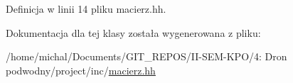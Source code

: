 Definicja w linii 14 pliku macierz.\+hh.



Dokumentacja dla tej klasy została wygenerowana z pliku\+:\begin{DoxyCompactItemize}
\item 
/home/michal/\+Documents/\+G\+I\+T\+\_\+\+R\+E\+P\+O\+S/\+I\+I-\/\+S\+E\+M-\/\+K\+P\+O/4\+: Dron podwodny/project/inc/\hyperlink{macierz_8hh}{macierz.\+hh}\end{DoxyCompactItemize}
